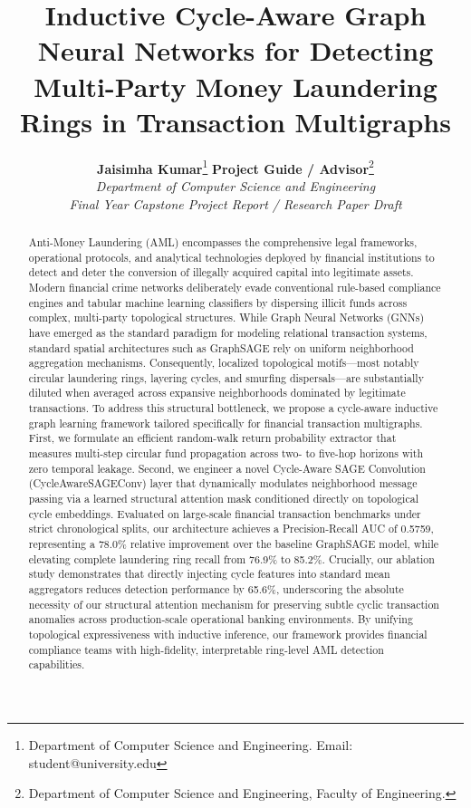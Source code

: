 \documentclass[10pt,twocolumn]{article}
\title{\textbf{\Large Inductive Cycle-Aware Graph Neural Networks for Detecting Multi-Party Money Laundering Rings in Transaction Multigraphs}}
\author{
    \textbf{Jaisimha Kumar}\thanks{Department of Computer Science and Engineering. Email: student@university.edu} \quad
    \textbf{Project Guide / Advisor}\thanks{Department of Computer Science and Engineering, Faculty of Engineering.} \\
    \textit{Department of Computer Science and Engineering} \\
    \textit{Final Year Capstone Project Report / Research Paper Draft}
}
\date{}
\begin{document}
\maketitle

\begin{abstract}
Anti-Money Laundering (AML) encompasses the comprehensive legal frameworks, operational protocols, and analytical technologies deployed by financial institutions to detect and deter the conversion of illegally acquired capital into legitimate assets. Modern financial crime networks deliberately evade conventional rule-based compliance engines and tabular machine learning classifiers by dispersing illicit funds across complex, multi-party topological structures. While Graph Neural Networks (GNNs) have emerged as the standard paradigm for modeling relational transaction systems, standard spatial architectures such as GraphSAGE rely on uniform neighborhood aggregation mechanisms. Consequently, localized topological motifs—most notably circular laundering rings, layering cycles, and smurfing dispersals—are substantially diluted when averaged across expansive neighborhoods dominated by legitimate transactions. To address this structural bottleneck, we propose a cycle-aware inductive graph learning framework tailored specifically for financial transaction multigraphs. First, we formulate an efficient random-walk return probability extractor that measures multi-step circular fund propagation across two- to five-hop horizons with zero temporal leakage. Second, we engineer a novel Cycle-Aware SAGE Convolution (CycleAwareSAGEConv) layer that dynamically modulates neighborhood message passing via a learned structural attention mask conditioned directly on topological cycle embeddings. Evaluated on large-scale financial transaction benchmarks under strict chronological splits, our architecture achieves a Precision-Recall AUC of 0.5759, representing a 78.0\% relative improvement over the baseline GraphSAGE model, while elevating complete laundering ring recall from 76.9\% to 85.2\%. Crucially, our ablation study demonstrates that directly injecting cycle features into standard mean aggregators reduces detection performance by 65.6\%, underscoring the absolute necessity of our structural attention mechanism for preserving subtle cyclic transaction anomalies across production-scale operational banking environments. By unifying topological expressiveness with inductive inference, our framework provides financial compliance teams with high-fidelity, interpretable ring-level AML detection capabilities.
\end{abstract}
\end{document}
